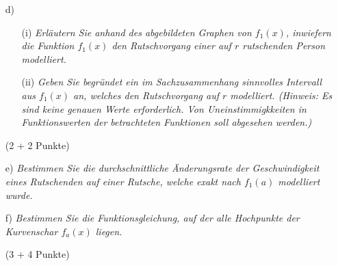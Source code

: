 \documentclass[ngerman, a4paper, 11pt]{article}
\begin{document}
\begin{figure}[h]
    \centering
\end{figure}

\begin{enumerate}
    \item[d)]
        \begin{enumerate}
            \item[(i)]
                \textit{Erläutern Sie anhand des abgebildeten Graphen von $f_{1}(x)$, inwiefern die Funktion $f_{1}(x)$ den Rutschvorgang einer auf $r$ rutschenden Person modelliert. }
            \item[(ii)]
                \textit{Geben Sie begründet ein im Sachzusammenhang sinnvolles Intervall aus $f_{1}(x)$ an, welches den Rutschvorgang auf $r$ modelliert. (Hinweis: Es sind keine genauen Werte erforderlich. Von Uneinstimmigkkeiten in Funktionswerten der betrachteten Funktionen soll abgesehen werden.)}
        \end{enumerate}
        \begin{flushright}
            (2 + 2 Punkte)
        \end{flushright}
\end{enumerate}

\begin{enumerate}
    \item[e)]
        \textit{Bestimmen Sie die durchschnittliche Änderungsrate der Geschwindigkeit eines Rutschenden auf einer Rutsche, welche exakt nach $f_{1}(a)$ modelliert wurde.}
    \item[f)]
        \textit{Bestimmen Sie die Funktionsgleichung, auf der alle Hochpunkte der Kurvenschar $f_{a}(x)$ liegen.}
        \begin{flushright}
            (3 + 4 Punkte)
        \end{flushright}
\end{enumerate}


\end{document}
